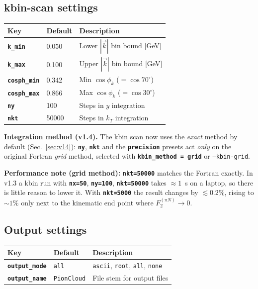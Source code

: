 \documentclass[11pt,a4paper]{article}
\newcommand{\inikey}[1]{\texttt{\textbf{#1}}}
\begin{document}
\subsection{kbin-scan settings}

\begin{center}
\begin{tabular}{lll}
\toprule
\textbf{Key} & \textbf{Default} & \textbf{Description} \\
\midrule
\inikey{k\_min}     & 0.050 & Lower $|\vec{k}|$ bin bound [GeV] \\
\inikey{k\_max}     & 0.100 & Upper $|\vec{k}|$ bin bound [GeV] \\
\inikey{cosph\_min} & 0.342 & Min $\cos\phi_k$ ($= \cos 70^{\circ}$) \\
\inikey{cosph\_max} & 0.866 & Max $\cos\phi_k$ ($= \cos 30^{\circ}$) \\
\inikey{ny}         & 100   & Steps in $y$ integration \\
\inikey{nkt}        & 50000 & Steps in $k_T$ integration \\
\bottomrule
\end{tabular}
\end{center}

\textbf{Integration method (v1.4).}  The kbin scan now uses the
\emph{exact} method by default (Sec.~\ref{sec:v14}): \inikey{ny},
\inikey{nkt} and the \inikey{precision} presets act \emph{only} on the
original Fortran \emph{grid} method, selected with
\inikey{kbin\_method = grid} or \texttt{--kbin-grid}.

\textbf{Performance note (grid method):} \inikey{nkt=50000} matches the Fortran
exactly.  In v1.3 a kbin run with \inikey{nx=50}, \inikey{ny=100},
\inikey{nkt=50000} takes $\approx1$~s on a laptop, so there is little
reason to lower it.  With \inikey{nkt=5000} the result changes by
$\lesssim0.2\%$, rising to $\sim1\%$ only next to the kinematic end point
where $F_2^{(\pi N)}\to0$.

\subsection{Output settings}

\begin{center}
\begin{tabular}{lll}
\toprule
\textbf{Key} & \textbf{Default} & \textbf{Description} \\
\midrule
\inikey{output\_mode} & \texttt{all}    & \texttt{ascii}, \texttt{root}, \texttt{all}, \texttt{none} \\
\inikey{output\_name} & \texttt{PionCloud} & File stem for output files \\
\bottomrule
\end{tabular}
\end{center}
\end{document}
